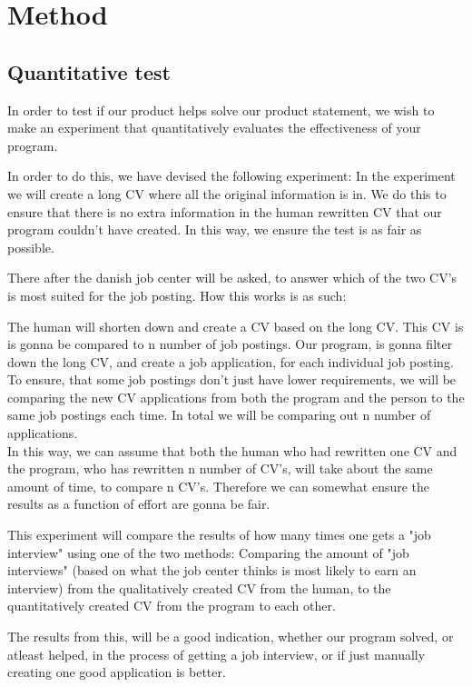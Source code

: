 \section{Method}\label{sec:method}
\subsection{Quantitative test}
In order to test if our product helps solve our product statement, we wish
to make an experiment that quantitatively evaluates the effectiveness of your
program. 

In order to do this, we have devised the following experiment:
In the experiment we will create a long CV where all the original information
is in. We do this to ensure that there is no extra information in the human 
rewritten CV that our program couldn't have created. In this way, we ensure
the test is as fair as possible.

There after the danish job center will be asked, to answer which of the two CV's is most suited
for the job posting. How this works is as such:

The human will shorten down and create a CV based on the long CV. This CV is
is gonna be compared to n number of job postings.
Our program, is gonna filter down the long CV, and create a job application,
for each individual job posting. 
To ensure, that some job postings don't just have lower requirements, we will be
comparing the new CV applications from both the program and the person to the same 
job postings each time. In total we will be comparing out n number of applications.
\\
In this way, we can assume that both the human who had rewritten one
CV and the program, who has rewritten n number of CV's,
will take about the same amount of time, to compare n CV's.
Therefore we can somewhat ensure the results as a function of effort are gonna
be fair.

This experiment will compare the results of how many times one gets a "job
interview" using one of the two methods: Comparing the amount of 
"job interviews" (based on what the job center thinks is most likely to earn an interview) 
from the qualitatively created CV from
the human, to the quantitatively created CV from the program to
each other.

The results from this, will be a good indication, whether our program solved, or
atleast helped, in the process of getting a job interview, or if just manually
creating one good application is better.
